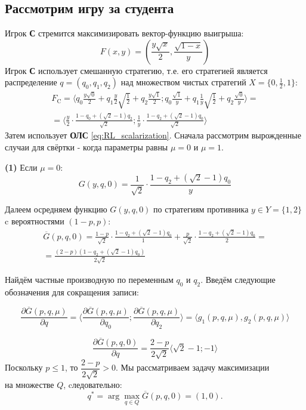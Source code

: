 \subsection{Рассмотрим игру за студента}

Игрок \textbf{С} стремится максимизировать вектор-функцию выигрыша: 
$$
	F(x, y) = (\frac{y\sqrt{x}}{2},\frac{\sqrt{1-x}}{y})
$$
Игрок \textbf{С} использует смешанную стратегию, т.е. его стратегией является
распределение $q=(q_0,q_1,q_2)$ над множеством чистых стратегий 
$X=\{0,\frac{1}{2},1\}$:
\begin{gather*}
	F_\textrm{C}=
	\big \langle
		q_0\frac{y\sqrt{0}}{2} + 
		q_1\frac{y}{2} \sqrt{\frac{1}{2}} + 
		q_2\frac{y\sqrt{1}}{2};
		q_0\frac{\sqrt{1}}{y} +
		q_1\frac{1}{y} \sqrt{\frac{1}{2}} +
		q_2\frac{\sqrt{0}}{y}
	\big \rangle = 
	\\
	=\big \langle
		\frac{y}{2}\cdot\frac{1-q_0+(\sqrt{2}-1)q_2}{\sqrt{2}};
		\frac{1}{y}\cdot\frac{1-q_2+(\sqrt{2}-1)q_0}{\sqrt{2}}
	\big \rangle
\end{gather*}
Затем использует \textbf{ОЛС} \eqref{eq:RL_scalarization}. 
Сначала рассмотрим вырожденные случаи для свёртки - когда 
параметры равны $\mu=0$ и  $\mu=1$. 


\textbf{(1)} 
Если $\mu=0$:
$$
	G(y,q,0)=\frac{1}{\sqrt{2}}\cdot \frac{1-q_2+(\sqrt{2}-1)q_0}{y}
$$	

Далеем осредняем функцию $G(y,q,0)$ по стратегиям 
противника $y \in Y=\{1,2\}$ c вероятностями $(1-p,p)$:
\begin{gather*}
	\overline G(p,q,0)=
	\frac{1-p}{\sqrt{2}} \cdot \frac{1-q_2+(\sqrt{2}-1)q_0}{1}+
	\frac{p}{\sqrt{2}} \cdot \frac{1-q_2+(\sqrt{2}-1)q_0}{2}=\\
	=\frac{(2-p)(1-q_2+(\sqrt{2}-1)q_0)}{2\sqrt{2}}
\end{gather*}
	
Найдём частные производную по переменным $q_0$ и $q_2$. 
Введём следующие обозначения для сокращения записи:

\begin{equation}
	\frac{\partial \overline G(p,q,\mu)}{\partial q}=
	\langle 
		\frac{\partial \overline G(p,q,\mu)}{\partial q_0};
		\frac{\partial \overline G(p,q,\mu)}{\partial q_2} 
	\rangle=
	\langle g_1(p,q,\mu), g_2(p,q,\mu) \rangle
	\label{eq:G_dericative}
\end{equation}

$$
	\frac{\partial \overline G(p,q,0)}{\partial q}
	=\frac{2-p}{2\sqrt{2}} \langle \sqrt{2}-1;-1\rangle
$$
Поскольку $p \leqslant 1$, то $\dfrac{2-p}{2\sqrt{2}} > 0 $.
Мы рассматриваем задачу максимизации \\ на множестве $Q$, cледовательно:
$$
	q^* = \arg \max \limits_{q \in Q} \overline G(p,q,0)=(1,0).
$$
	
